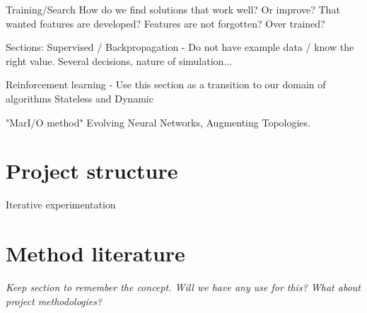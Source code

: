     Training/Search
      How do we find solutions that work well? Or improve?
      That wanted features are developed? Features are not forgotten?
      Over trained?

Sections:
Supervised / Backpropagation - Do not have example data / know the right value. Several decisions, nature of simulation...

Reinforcement learning - Use this section as a transition to our domain of algorithms
    Stateless and Dynamic

"MarI/O method"
    Evolving Neural Networks, Augmenting Topologies. 

\section{Project structure}
Iterative experimentation

\section{Method literature}
\textit{Keep section to remember the concept. Will we have any use for this? What about project methodologies?}
